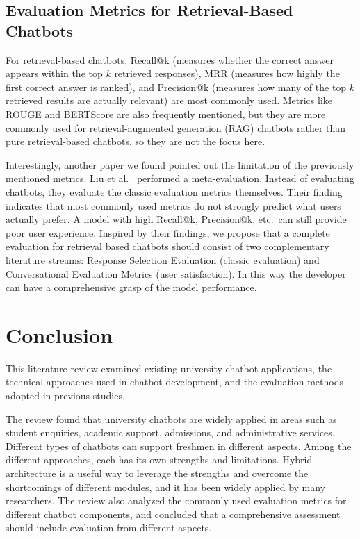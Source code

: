 \documentclass[12pt,a4paper]{article}
\begin{document}
\subsection{Evaluation Metrics for Retrieval-Based Chatbots}

For retrieval-based chatbots, Recall@k (measures whether the correct answer appears within the top $k$ retrieved responses), MRR (measures how highly the first correct answer is ranked), and Precision@k (measures how many of the top $k$ retrieved results are actually relevant) are most commonly used. Metrics like ROUGE and BERTScore are also frequently mentioned, but they are more commonly used for retrieval-augmented generation (RAG) chatbots rather than pure retrieval-based chatbots, so they are not the focus here.

Interestingly, another paper we found pointed out the limitation of the previously mentioned metrics. Liu et al.\ \cite{liu2021meta} performed a meta-evaluation. Instead of evaluating chatbots, they evaluate the classic evaluation metrics themselves. Their finding indicates that most commonly used metrics do not strongly predict what users actually prefer. A model with high Recall@k, Precision@k, etc.\ can still provide poor user experience. Inspired by their findings, we propose that a complete evaluation for retrieval based chatbots should consist of two complementary literature streams: Response Selection Evaluation (classic evaluation) and Conversational Evaluation Metrics (user satisfaction). In this way the developer can have a comprehensive grasp of the model performance.

\section{Conclusion}
This literature review examined existing university chatbot applications, 
the technical approaches used in chatbot development, 
and the evaluation methods adopted in previous studies.

The review found that university chatbots are widely applied in areas 
such as student enquiries, academic support, admissions, and administrative services. 
Different types of chatbots can support freshmen in different aspects.
Among the different approaches, each has its own strengths and limitations.
Hybrid architecture is a useful way to leverage the strengths and overcome the shortcomings of different modules, and it has been widely applied by many researchers.
The review also analyzed the commonly used evaluation metrics for different chatbot components,
and concluded that a comprehensive assessment should include evaluation from different aspects.
\end{document}
